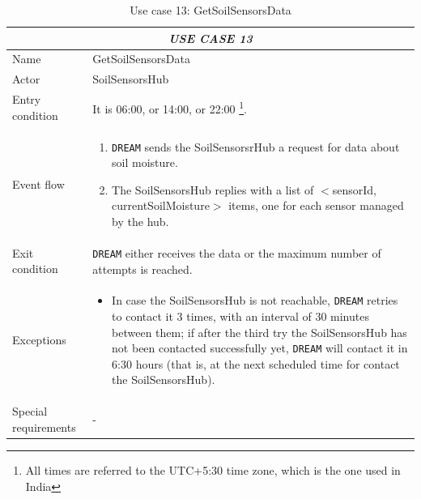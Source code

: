 \documentclass{article}
\begin{document}
\newpage

\centering
\begin{longtable}{|p{3.5cm}|m{8cm}|}
\caption{Use case 13: GetSoilSensorsData}
 \label{uc13}
 \hline
 \multicolumn{2}{|c|}{\cellcolor{white}\emph{USE CASE 13}} \\
 \endfirsthead
 \endhead
 \endfoot
 \endlastfoot
 \hline
 Name & GetSoilSensorsData\\
 \hline
 Actor & SoilSensorsHub\\
 \hline
 Entry condition & It is 06:00, or 14:00, or 22:00 \footnote{All times are referred to the UTC+5:30 time zone, which is the one used in India}.\\
 \hline 
 Event flow & \begin{enumerate}
    \item \verb|DREAM| sends the SoilSensorsrHub a request for data about soil moisture.
    \item The SoilSensorsHub replies with a list of $<$sensorId, currentSoilMoisture$>$ items, one for each sensor managed by the hub.
 \end{enumerate}\\
 \hline
 Exit condition & \verb|DREAM| either receives the data or the maximum number of attempts is reached.\\
 \hline
 Exceptions & \begin{itemize}
     \item In case the SoilSensorsHub is not reachable, \verb|DREAM| retries to contact it 3 times, with an interval of 30 minutes between them; if after the third try the SoilSensorsHub has not been contacted successfully yet, \verb|DREAM| will contact it in 6:30 hours (that is, at the next scheduled time for contact the SoilSensorsHub).
 \end{itemize}\\
 \hline
 Special requirements & -\\
 \hline
\end{longtable}
\end{document}
